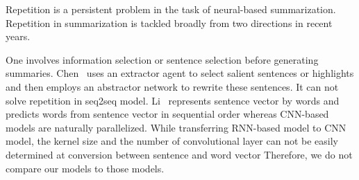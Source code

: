 Repetition is a persistent problem in the task of 
neural-based summarization. 
Repetition in summarization is tackled broadly from two directions in recent years. 

One involves information selection or sentence
selection before generating summaries.
Chen~ uses an extractor agent 
to select salient sentences or highlights and then employs 
an abstractor network to rewrite these sentences.
It can not solve repetition in seq2seq model.
Li~ represents sentence vector by words 
and predicts words from sentence vector in sequential order 
whereas CNN-based models are naturally parallelized. 
While transferring RNN-based model to CNN model, the kernel size and the number of 
convolutional layer can not be easily determined at conversion between sentence and word vector 
Therefore, we do not compare our models to those models. 

